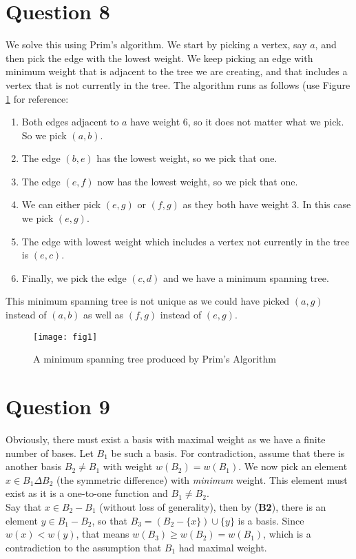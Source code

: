 \documentclass[a4paper, fleqn]{article}
\begin{document}
\section*{Question 8}
We solve this using Prim's algorithm. We start by picking a vertex, say $a$, and then pick the edge with the lowest weight. We keep picking an edge with minimum weight that is adjacent to the tree we are creating, and that includes a vertex that is not currently in the tree. The algorithm runs as follows (use Figure \ref{fig1} for reference:
\begin{enumerate}
  \item Both edges adjacent to $a$ have weight $6$, so it does not matter what we pick. So we pick $(a,b)$.
  \item The edge $(b,e)$ has the lowest weight, so we pick that one.
  \item The edge $(e,f)$ now has the lowest weight, so we pick that one.
  \item We can either pick $(e,g)$ or $(f,g)$ as they both have weight $3$. In this case we pick $(e,g)$.
  \item The edge with lowest weight which includes a vertex not currently in the tree is $(e,c)$.
  \item Finally, we pick the edge $(c,d)$ and we have a minimum spanning tree.
\end{enumerate}
This minimum spanning tree is not unique as we could have picked $(a,g)$ instead of $(a,b)$ as well as $(f,g)$ instead of $(e,g)$.
\begin{figure}[H]
  \centering
  \texttt{[image: fig1]}
  \caption{A minimum spanning tree produced by Prim's Algorithm}
  \label{fig1}
\end{figure}

\section*{Question 9}
Obviously, there must exist a basis with maximal weight as we have a finite number of bases. Let $B_1$ be such a basis. For contradiction, assume that there is another basis $B_2\neq B_1$ with weight $w(B_2)=w(B_1)$. We now pick an element $x\in B_1\Delta B_2$ (the symmetric difference) with \textit{minimum} weight. This element must exist as it is a one-to-one function and $B_1\neq B_2$.  \\
Say that $x\in B_2-B_1$ (without loss of generality), then by (\textbf{B2}), there is an element $y\in B_1-B_2$, so that $B_3=(B_2-\{x\})\cup\{y\}$ is a basis. Since $w(x)<w(y)$, that means $w(B_3)\geq w(B_2)=w(B_1)$, which is a contradiction to the assumption that $B_1$ had maximal weight.
\end{document}
